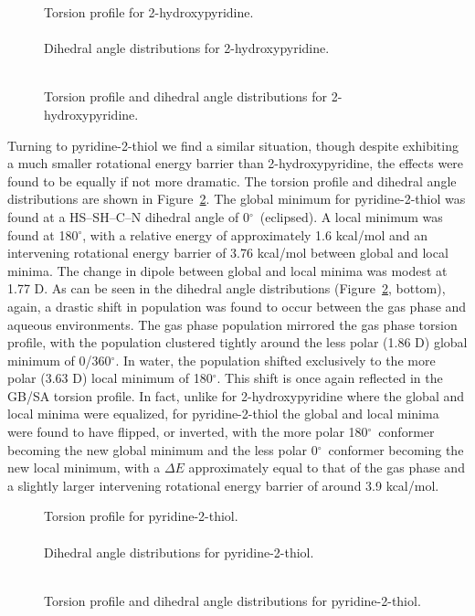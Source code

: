 \documentclass[12pt]{report}
\def\deg{$^{\circ}$}
\def\figlab{Figure}\def\figslab{\figlab s}
\newcommand*\fig[1]{\figlab~\ref{#1}}
\begin{document}
\begin{figure}[htbp]
\centering
Torsion profile for 2-hydroxypyridine.\\
\\
Dihedral angle distributions for 2-hydroxypyridine.\\
\\
\caption{Torsion profile and dihedral angle distributions for 2-hydroxypyridine.}
\label{dihp6ohgb}
\end{figure}

Turning to pyridine-2-thiol we find a similar situation, though despite exhibiting a much smaller rotational energy barrier than 2-hydroxypyridine, the effects were found to be equally if not more dramatic. The torsion profile and dihedral angle distributions are shown in \fig{dihp6shgb}. The global minimum for pyridine-2-thiol was found at a HS--SH--C--N dihedral angle of 0\deg\ (eclipsed). A local minimum was found at 180\deg, with a relative energy of approximately 1.6 kcal/mol and an intervening rotational energy barrier of 3.76 kcal/mol between global and local minima. The change in dipole between global and local minima was modest at 1.77 D. As can be seen in the dihedral angle distributions (\fig{dihp6shgb}, bottom), again, a drastic shift in population was found to occur between the gas phase and aqueous environments. The gas phase population mirrored the gas phase torsion profile, with the population clustered tightly around the less polar (1.86 D) global minimum of 0/360\deg. In water, the population shifted exclusively to the more polar (3.63 D) local minimum of 180\deg. This shift is once again reflected in the GB/SA torsion profile. In fact, unlike for 2-hydroxypyridine where the global and local minima were equalized, for pyridine-2-thiol the global and local minima were found to have flipped, or inverted, with the more polar 180\deg\ conformer becoming the new global minimum and the less polar 0\deg\ conformer becoming the new local minimum, with a $\Delta E$ approximately equal to that of the gas phase and a slightly larger intervening rotational energy barrier of around 3.9 kcal/mol.

\begin{figure}[htbp]
\centering
Torsion profile for pyridine-2-thiol.\\
\\
Dihedral angle distributions for pyridine-2-thiol.\\
\\
\caption{Torsion profile and dihedral angle distributions for pyridine-2-thiol.}
\label{dihp6shgb}
\end{figure}
\end{document}
